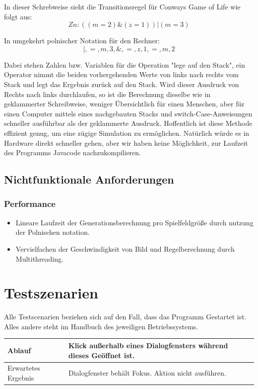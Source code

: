 \documentclass[11pt,a4paper]{article}
\begin{document}
\par
In dieser Schrebweise sieht die Transitionsregel für Conways Game of Life wie folgt aus:
\[Zn : ((m=2)\&(z=1))|(m=3) \]
\par
In umgekehrt polnischer Notation für den Rechner:
\[|,=,m,3,\&,=,z,1,=,m,2\]
\par
Dabei stehen Zahlen bzw. Variablen für die Operation "lege auf den Stack", ein Operator nimmt die beiden vorhergehenden Werte von links nach rechts vom Stack und legt das Ergebnis zurück auf den Stack.
Wird dieser Ausdruck von Rechts nach links durchlaufen, so ist die Berechnung dieselbe wie in geklammerter Schreibweise, weniger Übersichtlich für einen Menschen, aber für einen Computer mittels eines nachgebauten Stacks und switch-Case-Anweisungen schneller ausführbar als der geklammerte Ausdruck. Hoffentlich ist diese Methode effizient genug, um eine zügige Simulation zu ermöglichen. Natürlich würde es in Hardware direkt schneller gehen, aber wir haben keine Möglichkeit, zur Laufzeit des Programms Javacode nachzukompilieren. 

 
\subsection{Nichtfunktionale Anforderungen}
\subsubsection{Performance}
\begin{itemize}
    \item Lineare Laufzeit der Generationsberechnung pro Spielfeldgröße durch nutzung der Polnischen notation.
    \item Vervielfachen der Geschwindigkeit von Bild und Regelberechnung durch Multithreading.
\end{itemize}

\pagebreak

\section{Testszenarien}
Alle Testscenarien beziehen sich auf den Fall, dass das Programm Gestartet ist. Alles andere steht im Handbuch des jeweiligen Betriebssystems.

\begin{longtable}[m]{|m{3cm}|m{10cm}|}
\hline
Ablauf&Klick außerhalb eines Dialogfensters während dieses Geöffnet ist.\\
\hline
Erwartetes Ergebnis&Dialogfenster behält Fokus. Aktion nicht ausführen.\\
\hline
\end{longtable}
\end{document}
